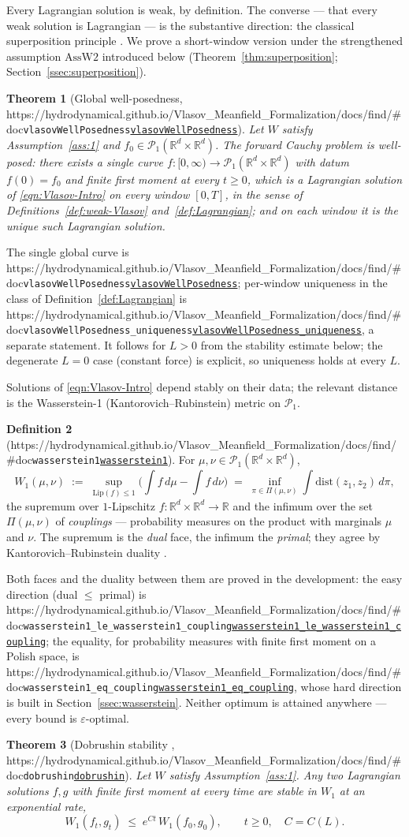 \documentclass[11pt]{article}
\theoremstyle{plain}
\newtheorem{theorem}{Theorem}[section]
\theoremstyle{definition}
\newtheorem{definition}[theorem]{Definition}
\theoremstyle{remark}
\newcommand{\R}{\mathbb{R}}
\newcommand{\Wone}{W_1}
\newcommand{\lean}[1]{\texttt{#1}}
\newcommand{\leanbaseurl}{https://hydrodynamical.github.io/Vlasov\_Meanfield\_Formalization/docs/find/\#doc}
\newcommand{\leanlink}[1]{\ifx\leanbaseurl\empty\lean{#1}\else\href{\leanbaseurl/Vlasov.#1}{\lean{#1}}\fi}
\begin{document}
Every Lagrangian solution is weak, by definition. The converse --- that every weak solution
is Lagrangian --- is the substantive direction: the classical superposition principle \cite{AGS}. We
prove a short-window version under the strengthened assumption $\mathrm{AssW2}$ introduced below
(Theorem~\ref{thm:superposition}; Section~\ref{ssec:superposition}).

\begin{theorem}[Global well-posedness, \leanlink{vlasovWellPosedness}]\label{thm:wp}
  Let $W$ satisfy Assumption~\ref{ass:1} and $f_0 \in \mathcal{P}_1(\R^d \times \R^d)$. The forward
  Cauchy problem is well-posed: there exists a \emph{single} curve
  $f:[0,\infty)\rightarrow \mathcal{P}_1(\R^d \times \R^d)$ with datum $f(0)=f_0$ and finite first
  moment at every $t\ge 0$, which is a Lagrangian solution of \eqref{eqn:Vlasov-Intro} on every
  window $[0,T]$, in the sense of Definitions~\ref{def:weak-Vlasov} and~\ref{def:Lagrangian}; and on
  each window it is the unique such Lagrangian solution.
\end{theorem}
\noindent The single global curve is \leanlink{vlasovWellPosedness}; per-window uniqueness in the
class of Definition~\ref{def:Lagrangian} is \leanlink{vlasovWellPosedness\_uniqueness}, a separate
statement. It follows for $L>0$ from the stability estimate below; the degenerate $L=0$ case
(constant force) is explicit, so uniqueness holds at every $L$.

Solutions of \eqref{eqn:Vlasov-Intro} depend stably on their data; the relevant distance is the Wasserstein-1
(Kantorovich--Rubinstein) metric on $\mathcal{P}_1$.
\begin{definition}[\leanlink{wasserstein1}]\label{def:w1}
  For $\mu,\nu \in \mathcal{P}_1(\R^d\times\R^d)$,
  \[
    \Wone(\mu,\nu) \;:=\; \sup_{\mathrm{Lip}(f)\le 1}\Big(\int f\,d\mu - \int f\,d\nu\Big)
    \;=\; \inf_{\pi\in\Pi(\mu,\nu)} \int \mathrm{dist}(z_1,z_2)\,d\pi ,
  \]
  the supremum over $1$-Lipschitz $f:\R^d\times\R^d\to\R$ and the infimum over the set
  $\Pi(\mu,\nu)$ of \emph{couplings} --- probability measures on the product with marginals
  $\mu$ and $\nu$. The supremum is the \emph{dual} face, the infimum the \emph{primal};
  they agree by Kantorovich--Rubinstein duality \cite{Villani,AGS}.
\end{definition}
\noindent Both faces and the duality between them are proved in the development: the easy
direction (dual $\le$ primal) is \leanlink{wasserstein1\_le\_wasserstein1\_coupling}; the
equality, for probability measures with finite first moment on a Polish space, is
\leanlink{wasserstein1\_eq\_coupling}, whose hard direction is built in
Section~\ref{ssec:wasserstein}. Neither optimum is attained anywhere --- every bound is
$\varepsilon$-optimal.
\begin{theorem}[Dobrushin stability \cite{Dobrushin}, \leanlink{dobrushin}]\label{thm:dob}
  Let $W$ satisfy Assumption~\ref{ass:1}. Any two Lagrangian solutions $f,g$ with
  finite first moment at every time are stable in $\Wone$ at an exponential rate,
  \[ \Wone(f_t,g_t)\;\le\; e^{Ct}\,\Wone(f_0,g_0),\qquad t\ge 0,\quad C=C(L). \]
\end{theorem}
\end{document}
